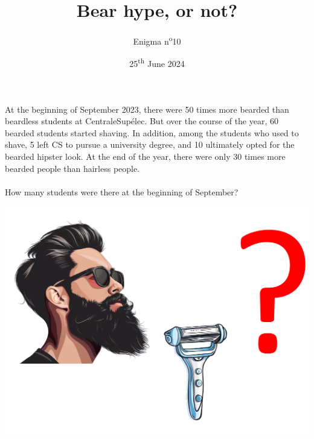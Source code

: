 \documentclass[a4paper, top=10mm]{article}
\title{\textbf{\huge{Bear hype, or not?}}}
\author{Enigma n\textsuperscript{o}10}
\date{25\textsuperscript{th} June 2024}
\begin{document}
	\maketitle
	
	\Large
	At the beginning of September 2023, there were 50 times more bearded than beardless students at CentraleSupélec.
	But over the course of the year, 60 bearded students started shaving.
	In addition, among the students who used to shave, 5 left CS to pursue a university degree, and 10 ultimately opted for the bearded hipster look.
	At the end of the year, there were only 30 times more bearded people than hairless people.\\
	\\
	How many students were there at the beginning of September?
	
	\vspace{2cm}
	
	\begin{center}
		\includegraphics[width=\linewidth]{10hype.pdf}
	\end{center}
	
	
\end{document}
